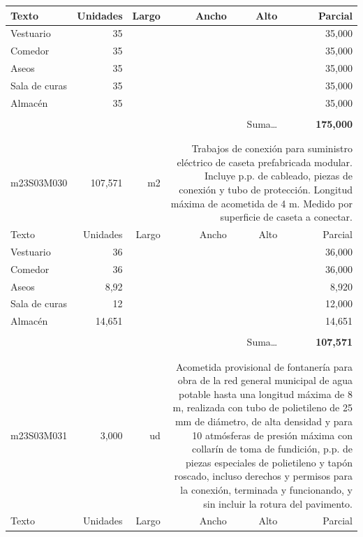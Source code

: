 \documentclass{book}%
\begin{document}
\begin{longtable}{lrrrrr}
Texto&Unidades&Largo&Ancho&Alto&Parcial\\%
\hline%
\multicolumn{1}{p{3.5cm}}{Vestuario}&35&&&&    35,000\\%
\multicolumn{1}{p{3.5cm}}{Comedor}&35&&&&    35,000\\%
\multicolumn{1}{p{3.5cm}}{Aseos}&35&&&&    35,000\\%
\multicolumn{1}{p{3.5cm}}{Sala de curas}&35&&&&    35,000\\%
\multicolumn{1}{p{3.5cm}}{Almacén}&35&&&&    35,000\\%
&&&&&\\%
\multicolumn{5}{r}{Suma\ldots}&\textbf{   175,000}\\%
\hline%
&&&&&\\%
&&&&&\\%
m23S03M030&   107,571& m2&\multicolumn{3}{p{6cm}}{\scriptsize Trabajos de conexión para suministro eléctrico de caseta prefabricada modular. Incluye p.p. de cableado, piezas de conexión y tubo de protección. Longitud máxima de acometida de 4 m. Medido por superficie de caseta a conectar.\normalsize}\\%
Texto&Unidades&Largo&Ancho&Alto&Parcial\\%
\hline%
\multicolumn{1}{p{3.5cm}}{Vestuario}&36&&&&    36,000\\%
\multicolumn{1}{p{3.5cm}}{Comedor}&36&&&&    36,000\\%
\multicolumn{1}{p{3.5cm}}{Aseos}&8,92&&&&     8,920\\%
\multicolumn{1}{p{3.5cm}}{Sala de curas}&12&&&&    12,000\\%
\multicolumn{1}{p{3.5cm}}{Almacén}&14,651&&&&    14,651\\%
&&&&&\\%
\multicolumn{5}{r}{Suma\ldots}&\textbf{   107,571}\\%
\hline%
&&&&&\\%
&&&&&\\%
m23S03M031&     3,000& ud&\multicolumn{3}{p{6cm}}{\scriptsize Acometida provisional de fontanería para obra de la red general municipal de agua potable hasta una longitud máxima de 8 m, realizada con tubo de polietileno de 25 mm de diámetro, de alta densidad y para 10 atmósferas de presión máxima con collarín de toma de fundición, p.p. de piezas especiales de polietileno y tapón roscado, incluso derechos y permisos para la conexión, terminada y funcionando, y sin incluir la rotura del pavimento.\normalsize}\\%
Texto&Unidades&Largo&Ancho&Alto&Parcial\\%

\end{longtable}
\end{document}
